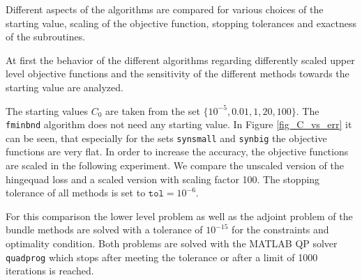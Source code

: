 Different aspects of the algorithms are compared for various choices  of the starting value, scaling of the objective function, stopping tolerances and exactness of the subroutines.


At first the behavior of the different algorithms regarding differently scaled upper level objective functions and the sensitivity of the different methods towards the starting value are analyzed.

The starting values \(C_0 \) are taken from the set \(\{10^{-5},0.01,1,20,100\}\). The \texttt{fminbnd} algorithm does not need any starting value.
In Figure \ref{fig_C_vs_err} it can be seen, that especially for the sets \texttt{synsmall} and \texttt{synbig} the objective functions are very flat. In order to increase the accuracy, the objective functions are scaled in the following experiment.
We compare the unscaled version of the hingequad loss and a scaled version with scaling factor 100.
The stopping tolerance of all methods is set to \(\texttt{tol} = 10^{-6}\).

For this comparison the lower level problem as well as the adjoint problem of the bundle methods are solved with a tolerance of \(10^{-15}\) for the constraints and optimality condition.
Both problems are solved with the MATLAB QP solver \texttt{quadprog} which stops after meeting the tolerance or after a limit of 1000 iterations is reached.

